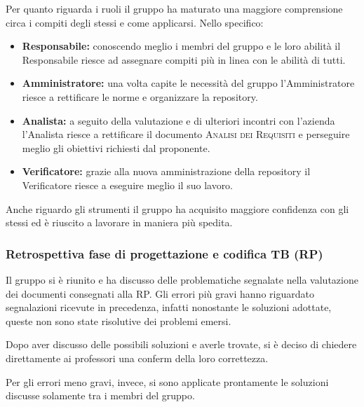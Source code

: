\documentclass[../piano_di_qualifica.tex]{subfiles}
\begin{document}
Per quanto riguarda i ruoli il gruppo ha maturato una maggiore comprensione circa i compiti degli stessi e come applicarsi. Nello specifico:
\begin{itemize}
	\item \textbf{Responsabile:} conoscendo meglio i membri del gruppo e le loro abilità il Responsabile riesce ad assegnare compiti più in linea con le abilità di tutti.
	\item \textbf{Amministratore:} una volta capite le necessità del gruppo l'Amministratore riesce a rettificare le norme e organizzare la repository.
	\item \textbf{Analista:} a seguito della valutazione e di ulteriori incontri con l'azienda l'Analista riesce a rettificare il documento \textsc{Analisi dei Requisiti} e perseguire meglio gli obiettivi richiesti dal proponente.
	\item \textbf{Verificatore:} grazie alla nuova amministrazione della repository il Verificatore riesce a eseguire meglio il suo lavoro.
\end{itemize}

Anche riguardo gli strumenti il gruppo ha acquisito maggiore confidenza con gli stessi ed è riuscito a lavorare in maniera più spedita.

\subsubsection{Retrospettiva fase di progettazione e codifica TB (RP)}
\label{par:retrospettiva-RP}

Il gruppo si è riunito e ha discusso delle problematiche segnalate nella valutazione dei documenti consegnati alla RP.
Gli errori più gravi hanno riguardato segnalazioni ricevute in precedenza, infatti nonostante le soluzioni adottate, queste non sono state risolutive dei problemi emersi.

Dopo aver discusso delle possibili soluzioni e averle trovate, si è deciso di chiedere direttamente ai professori una conferm della loro correttezza.

Per gli errori meno gravi, invece, si sono applicate prontamente le soluzioni discusse solamente tra i membri del gruppo.
\end{document}
